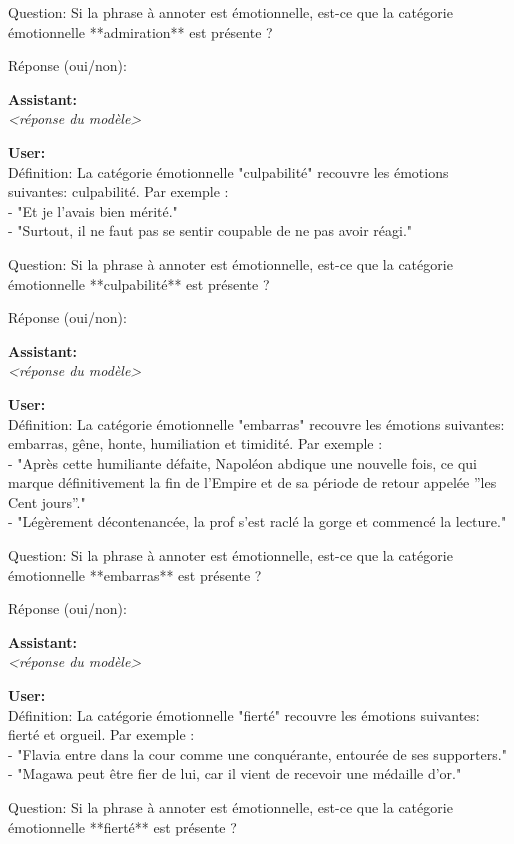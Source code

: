 {Question: Si la phrase à annoter est émotionnelle, est-ce que la catégorie émotionnelle **admiration** est présente ?

Réponse (oui/non):

\textbf{Assistant:}\\
\textit{<réponse du modèle>}

\textbf{User:}\\
Définition: La catégorie émotionnelle "culpabilité" recouvre les émotions suivantes: culpabilité. Par exemple :\\
- "Et je l'avais bien mérité."\\
- "Surtout, il ne faut pas se sentir coupable de ne pas avoir réagi."

Question: Si la phrase à annoter est émotionnelle, est-ce que la catégorie émotionnelle **culpabilité** est présente ?

Réponse (oui/non):

\textbf{Assistant:}\\
\textit{<réponse du modèle>}

\textbf{User:}\\
Définition: La catégorie émotionnelle "embarras" recouvre les émotions suivantes: embarras, gêne, honte, humiliation et timidité. Par exemple :\\
- "Après cette humiliante défaite, Napoléon abdique une nouvelle fois, ce qui marque définitivement la fin de l'Empire et de sa période de retour appelée ''les Cent jours''."\\
- "Légèrement décontenancée, la prof s'est raclé la gorge et commencé la lecture."

Question: Si la phrase à annoter est émotionnelle, est-ce que la catégorie émotionnelle **embarras** est présente ?

Réponse (oui/non):

\textbf{Assistant:}\\
\textit{<réponse du modèle>}

\textbf{User:}\\
Définition: La catégorie émotionnelle "fierté" recouvre les émotions suivantes: fierté et orgueil. Par exemple :\\
- "Flavia entre dans la cour comme une conquérante, entourée de ses supporters."\\
- "Magawa peut être fier de lui, car il vient de recevoir une médaille d'or."

Question: Si la phrase à annoter est émotionnelle, est-ce que la catégorie émotionnelle **fierté** est présente ?

}
